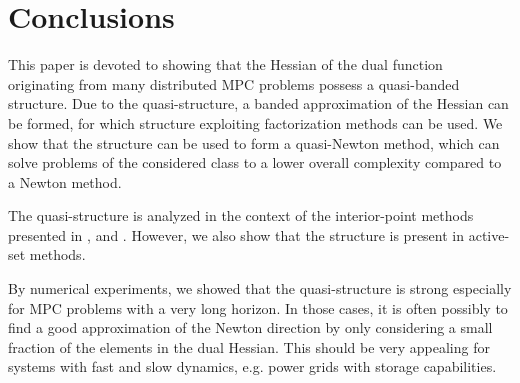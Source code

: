 \section{Conclusions} \label{S:Conclusions}

This paper is devoted to showing that the Hessian of the dual function originating from many distributed MPC problems possess a quasi-banded structure. Due to the quasi-structure, a banded approximation of the Hessian can be formed, for which structure exploiting factorization methods can be used. We show that the structure can be used to form a quasi-Newton method, which can solve problems of the considered class to a lower overall complexity compared to a Newton method.

The quasi-structure is analyzed in the context of the interior-point methods presented in \cite{Necoara2009a}, \cite{Quoc2013} and \cite{Klintberg2014}. However, we also show that the structure is present in active-set methods.

By numerical experiments, we showed that the quasi-structure is strong especially for MPC problems with a very long horizon. In those cases, it is often possibly to find a good approximation of the Newton direction by only considering a small fraction of the elements in the dual Hessian. This should be very appealing for systems with fast and slow dynamics, e.g. power grids with storage capabilities. 








